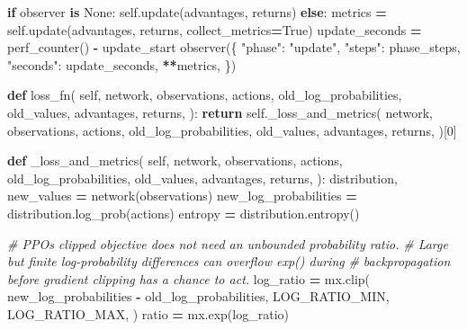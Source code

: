 \documentclass[
  american,
  11pt,
  letterpaper,
]{article}
\newenvironment{Shaded}{\begin{snugshade}}{\end{snugshade}}
\newcommand{\CommentTok}[1]{\textcolor[rgb]{0.56,0.35,0.01}{\textit{#1}}}
\newcommand{\ControlFlowTok}[1]{\textcolor[rgb]{0.13,0.29,0.53}{\textbf{#1}}}
\newcommand{\DecValTok}[1]{\textcolor[rgb]{0.00,0.00,0.81}{#1}}
\newcommand{\KeywordTok}[1]{\textcolor[rgb]{0.13,0.29,0.53}{\textbf{#1}}}
\newcommand{\NormalTok}[1]{#1}
\newcommand{\OperatorTok}[1]{\textcolor[rgb]{0.81,0.36,0.00}{\textbf{#1}}}
\newcommand{\StringTok}[1]{\textcolor[rgb]{0.31,0.60,0.02}{#1}}
\newcommand{\VariableTok}[1]{\textcolor[rgb]{0.00,0.00,0.00}{#1}}
\renewenvironment{Shaded}{\par\smallskip}{\par\smallskip}
\begin{document}
\begin{Shaded}
\begin{Highlighting}[]
            \ControlFlowTok{if}\NormalTok{ observer }\KeywordTok{is} \VariableTok{None}\NormalTok{:}
                \VariableTok{self}\NormalTok{.update(advantages, returns)}
            \ControlFlowTok{else}\NormalTok{:}
\NormalTok{                metrics }\OperatorTok{=} \VariableTok{self}\NormalTok{.update(advantages, returns, collect\_metrics}\OperatorTok{=}\VariableTok{True}\NormalTok{)}
\NormalTok{                update\_seconds }\OperatorTok{=}\NormalTok{ perf\_counter() }\OperatorTok{{-}}\NormalTok{ update\_start}
\NormalTok{                observer(\{}
                    \StringTok{"phase"}\NormalTok{: }\StringTok{"update"}\NormalTok{,}
                    \StringTok{"steps"}\NormalTok{: phase\_steps,}
                    \StringTok{"seconds"}\NormalTok{: update\_seconds,}
                    \OperatorTok{**}\NormalTok{metrics,}
\NormalTok{                \})}

    \KeywordTok{def}\NormalTok{ loss\_fn(}
        \VariableTok{self}\NormalTok{,}
\NormalTok{        network,}
\NormalTok{        observations,}
\NormalTok{        actions,}
\NormalTok{        old\_log\_probabilities,}
\NormalTok{        old\_values,}
\NormalTok{        advantages,}
\NormalTok{        returns,}
\NormalTok{    ):}
        \ControlFlowTok{return} \VariableTok{self}\NormalTok{.\_loss\_and\_metrics(}
\NormalTok{            network,}
\NormalTok{            observations,}
\NormalTok{            actions,}
\NormalTok{            old\_log\_probabilities,}
\NormalTok{            old\_values,}
\NormalTok{            advantages,}
\NormalTok{            returns,}
\NormalTok{        )[}\DecValTok{0}\NormalTok{]}

    \KeywordTok{def}\NormalTok{ \_loss\_and\_metrics(}
        \VariableTok{self}\NormalTok{,}
\NormalTok{        network,}
\NormalTok{        observations,}
\NormalTok{        actions,}
\NormalTok{        old\_log\_probabilities,}
\NormalTok{        old\_values,}
\NormalTok{        advantages,}
\NormalTok{        returns,}
\NormalTok{    ):}
\NormalTok{        distribution, new\_values }\OperatorTok{=}\NormalTok{ network(observations)}
\NormalTok{        new\_log\_probabilities }\OperatorTok{=}\NormalTok{ distribution.log\_prob(actions)}
\NormalTok{        entropy }\OperatorTok{=}\NormalTok{ distribution.entropy()}

        \CommentTok{\# PPO\textquotesingle{}s clipped objective does not need an unbounded probability ratio.}
        \CommentTok{\# Large but finite log{-}probability differences can overflow exp() during}
        \CommentTok{\# backpropagation before gradient clipping has a chance to act.}
\NormalTok{        log\_ratio }\OperatorTok{=}\NormalTok{ mx.clip(}
\NormalTok{            new\_log\_probabilities }\OperatorTok{{-}}\NormalTok{ old\_log\_probabilities,}
\NormalTok{            LOG\_RATIO\_MIN,}
\NormalTok{            LOG\_RATIO\_MAX,}
\NormalTok{        )}
\NormalTok{        ratio }\OperatorTok{=}\NormalTok{ mx.exp(log\_ratio)}


\end{Highlighting}
\end{Shaded}
\end{document}
